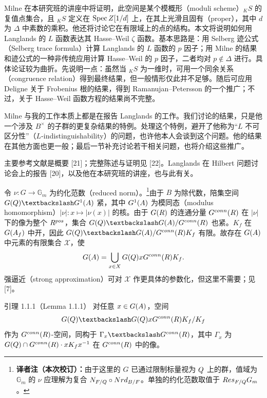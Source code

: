 Milne 在本研究班的讲座中将证明，此空间是某个模概形（moduli scheme）${}_KS$ 的复值点集合，且 ${}_KS$ 定义在 $\Spec\Z[1/d]$ 上，在其上光滑且固有（proper），其中 $d$ 为 $\Delta$ 中素数的乘积。他还将讨论它在有限域上的点的结构。本文将说明如何用 Langlands 的 $L$ 函数表达其 Hasse--Weil $\zeta$ 函数。基本思路是：用 Selberg 迹公式（Selberg trace formula）计算 Langlands 的 $L$ 函数的 $p$ 因子；用 Milne 的结果和迹公式的一种非传统应用计算 Hasse--Weil 的 $p$ 因子，二者均对 $p\notin\Delta$ 进行。具体论证较为曲折。先说明一点：虽然当 ${}_KS$ 为一维时，可用一个同余关系（congruence relation）得到最终结果，但一般情形仅此并不足够。随后可应用 Deligne 关于 Frobenius 根的结果，得到 Ramanujan--Petersson 的一个推广；不过，关于 Hasse--Weil 函数方程的结果尚不完整。

Milne 与我的工作本质上都是在报告 Langlands 的工作。我们讨论的结果，只是他一个涉及 $B^\times$ 的子群的更复杂结果的特例。处理这个特例，避开了他称为“$L$ 不可区分性”（$L$-indistinguishability）的问题，也许他本人会谈到这个问题。他的结果在其他方面也更一般；最后一节补充讨论若干相关问题，也将介绍这些推广。

主要参考文献是概要 [21]；完整陈述与证明见 [22]。Langlands 在 Hilbert 问题讨论会上的报告 [20]，以及他在本研究班的讲座，也与此有关。

令 $\nu:G\to\mathbb G_m$ 为约化范数（reduced norm）。\footnote{\textbf{译者注（本次校订）：}由于这里的 $G$ 已通过限制标量视为 $Q$ 上的群，值域为 $\mathbb G_m$ 的 $\nu$ 应理解为复合 $N_{F/Q}\circ Nrd_{B/F}$。单独的约化范数取值于 $Res_{F/Q}G_m$。}由于 $B$ 为除代数，陪集空间 $G(\Q)\backslash G^1(\A)$ 紧，其中 $G^1(A)$ 为模同态（modulus homomorphism）$|\nu|:x\mapsto|\nu(x)|$ 的核。由于 $G(R)$ 的连通分量 $G^{conn}(R)$ 在 $|\nu|$ 下的像为整个 $R^{pos}$，集合 $G(\Q)\backslash G(\A)/G^{\mathrm{conn}}(\R)$ 也紧。$K_f$ 在 $G(A_f)$ 中开，因此 $G(\Q)\backslash G(\A)/G^{\mathrm{conn}}(\R)K_f$ 有限。故存在 $G(A)$ 中元素的有限集合 $\mathcal X$，使
\[
 G(A)=\bigcup_{x\in X}G(Q)xG^{conn}(R)K_f.
\]
强逼近（strong approximation）可对 $\mathcal X$ 作更具体的参数化，但这里不需要；见 [7]。

\begin{originaltheorem}{引理 1.1.1（Lemma 1.1.1）}
对任意 $x\in G(A)$，空间
\[
 G(\Q)\backslash G(\Q)xG^{\mathrm{conn}}(\R)K_f/K_f
\]
作为 $G^{conn}(R)$-空间，同构于 $\Gamma_x\backslash G^{\mathrm{conn}}(\R)$，其中 $\Gamma_x$ 为 $G(Q)\cap G^{conn}(R)\cdot xK_fx^{-1}$ 在 $G^{conn}(R)$ 中的像。
\end{originaltheorem}

